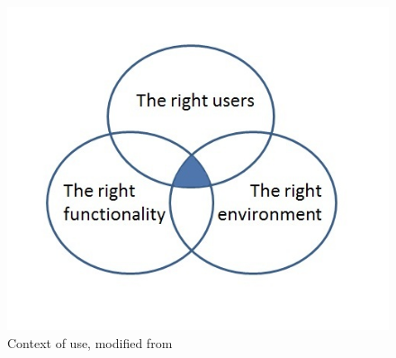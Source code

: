 \begin{figure} [ht!]
\centering
\includegraphics[scale=0.8]{contextOfUse.jpg}
\caption[Context of use]{Context of use, modified from \cite{contextofusefigure}}
\label{contextofuse}
\end{figure} 

